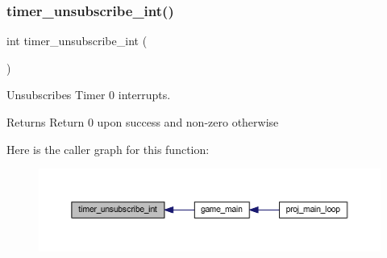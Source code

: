 \subsubsection{\texorpdfstring{timer\+\_\+unsubscribe\+\_\+int()}{timer\_unsubscribe\_int()}}
{\footnotesize\ttfamily int timer\+\_\+unsubscribe\+\_\+int (\begin{DoxyParamCaption}{ }\end{DoxyParamCaption})}



Unsubscribes Timer 0 interrupts. 

\begin{DoxyReturn}{Returns}
Return 0 upon success and non-\/zero otherwise 
\end{DoxyReturn}
Here is the caller graph for this function\+:
\nopagebreak
\begin{figure}[H]
\begin{center}
\leavevmode
\includegraphics[width=350pt]{group__timer_gab9eea51549744bca5c5c923b388bb4ee_icgraph}
\end{center}
\end{figure}
